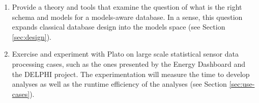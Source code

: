 \begin{enumerate}
%  
\item Provide a theory and tools that examine the question of what is the right schema and models for a models-aware database. In a sense, this question expands classical database design into the models space (see Section \ref{sec:design}).
%
\item Exercise and experiment with Plato on large scale statistical sensor data processing cases, such as the ones presented by the Energy Dashboard and the DELPHI project. The experimentation will measure the time to develop analyses as well as the runtime efficiency of the analyses (see Section \ref{sec:use-cases}).
%
\end{enumerate}

